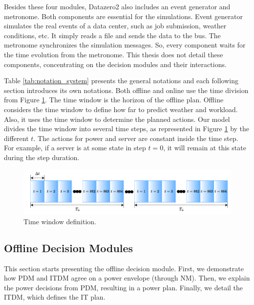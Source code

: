 Besides these four modules, Datazero2 also includes an event generator and metronome. Both components are essential for the simulations. Event generator simulates the real events of a data center, such as job submission, weather conditions, etc. It simply reads a file and sends the data to the bus. The metronome synchronizes the simulation messages. So, every component waits for the time evolution from the metronome. This thesis does not detail these components, concentrating on the decision modules and their interactions.



Table \ref{tab:notation_system} presents the general notations and each following section introduces its own notations. Both offline and online use the time division from Figure \ref{fig:time_window}. The time window is the horizon of the offline plan. Offline considers the time window to define how far to predict weather and workload. Also, it uses the time window to determine the planned actions. Our model divides the time window into several time steps, as represented in Figure \ref{fig:time_window} by the different $t$. The actions for power and server are constant inside the time step. For example, if a server is at some state in step $t=0$, it will remain at this state during the step duration.

\begin{figure}[!htb]
    \centering
    \includegraphics[scale=0.75]{Images/Model/Time window.pdf}
    \caption{Time window definition.}
    \label{fig:time_window}
\end{figure}

\subsection{Offline Decision Modules}
This section starts presenting the offline decision module. First, we demonstrate how PDM and ITDM agree on a power envelope (through NM). Then, we explain the power decisions from PDM, resulting in a power plan. Finally, we detail the ITDM, which defines the IT plan.


